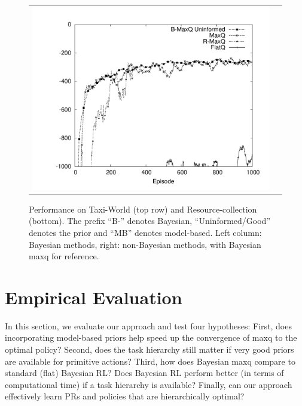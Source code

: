 \begin{figure}[ht]
\begin{tabular}{cc}
\includegraphics[trim=50 50 30 50, clip, scale=0.25]{exp/Wargus3322nb.pdf} \\
\end{tabular}

\caption{Performance on {\sf Taxi-World} (top row) and {\sf Resource-collection} (bottom). The
prefix ``B-'' denotes Bayesian, ``Uninformed/Good'' denotes the
prior and ``MB'' denotes model-based. Left column: Bayesian methods, right: non-Bayesian methods, with Bayesian {\sc maxq} for reference.}\label{fig:nopr}
\vspace{-0.2in}
\end{figure}

\section{Empirical Evaluation}
\label{sec:expts}

In this section, we evaluate our approach and test four hypotheses:
First, does incorporating model-based priors help speed up the
convergence of {\sc maxq} to the optimal policy? Second, does the task
hierarchy still matter if very good priors are available for primitive
actions? Third, how does Bayesian {\sc maxq} compare to standard
(flat) Bayesian RL? Does Bayesian RL perform better (in terms of
computational time) if a task hierarchy is available? Finally, can our
approach effectively learn PRs and policies that are
hierarchically optimal?

